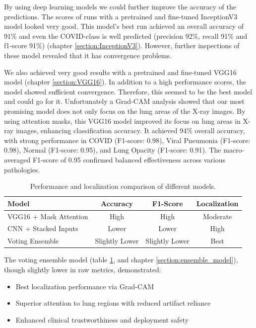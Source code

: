 \documentclass{article}
\begin{document}
By using deep learning models we could further improve the accuracy of the predictions. The scores of runs with a pretrained and fine-tuned InceptionV3 model looked very good. This model's best run achieved an overall accuracy of 91\% and even the COVID-class is well predicted (precision 92\%, recall 91\% and f1-score 91\%) (chapter \ref{section:InceptionV3}). However, further inspections of these model revealed that it has convergence problems. 

We also achieved very good results with a pretrained and fine-tuned VGG16 model (chapter \ref{section:VGG16}). In addition to a high performance scores, the model showed sufficient convergence. Therefore, this seemed to be the best model and could go for it. Unfortunately a Grad-CAM analysis showed that our most promising model does not only focus on the lung areas of the X-ray images. By using attention masks, this VGG16 model improved its focus on lung areas in X-ray images, enhancing classification accuracy. It achieved 94\% overall accuracy, with strong performance in COVID (F1-score: 0.98), Viral Pneumonia (F1-score: 0.98), Normal (F1-score: 0.95), and Lung Opacity (F1-score: 0.91). The macro-averaged F1-score of 0.95 confirmed balanced effectiveness across various pathologies.


\begin{table}%
\centering
\begin{tabular}{|l|c|c|c|}
\hline
\textbf{Model} & \textbf{Accuracy} & \textbf{F1-Score} & \textbf{Localization} \\
\hline
VGG16 + Mask Attention & High & High & Moderate \\
\hline
CNN + Stacked Inputs & Lower & Lower & High \\
\hline
Voting Ensemble & Slightly Lower & Slightly Lower & Best \\
\hline
\end{tabular}
\caption{Performance and localization comparison of different models.}
\label{tab:ensemble_performance}
\end{table}

The voting ensemble model (table \ref{tab:ensemble_performance}, and chapter \ref{section:ensemble_model}), though slightly lower in raw metrics, demonstrated:

\begin{itemize}
  \item Best localization performance via Grad-CAM
  \item Superior attention to lung regions with reduced artifact reliance
  \item Enhanced clinical trustworthiness and deployment safety
\end{itemize}
\end{document}

